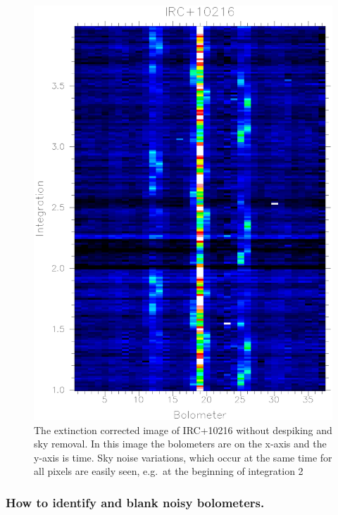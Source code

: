 \documentclass[twoside,11pt]{article}
\newcommand{\xlabel}[1]{}
\renewcommand{\_}{\texttt{\symbol{95}}}
\begin{document}
\begin{figure}
\begin{center}
\includegraphics[width=5.5in]{sho_fig1.eps}
\caption{The extinction
corrected image of IRC+10216 without despiking and sky removal. In this image the bolometers are on the x-axis and the y-axis is time. Sky noise variations,
which occur at the same time for all pixels are easily seen, e.g.\ at the beginning of integration 2}
\label{fig:raw}
\end{center}
\end{figure}


\subsubsection{\xlabel{Blanking}How to identify and blank noisy bolometers.}
\end{document}
